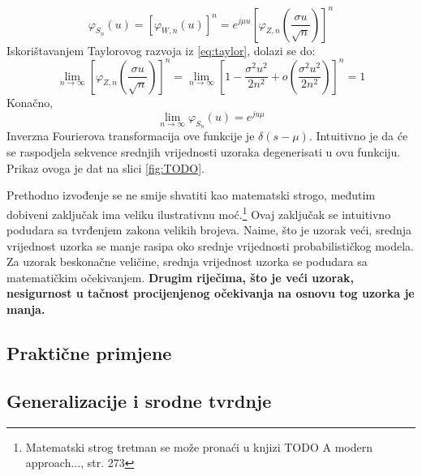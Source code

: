 \begin{equation}
  \varphi_{S_n}(u) = [\varphi_{W,n}(u)]^n
  = e^{j\mu u} \left[\varphi_{Z,n}\left(\frac{\sigma u}{\sqrt{n}}\right)\right]^n
\end{equation}
%
Iskorištavanjem Taylorovog razvoja iz \eqref{eq:taylor}, dolazi se do:
\begin{equation}
  \lim_{n\to\infty}
    \left[\varphi_{Z,n}\left(\frac{\sigma u}{\sqrt{n}}\right)\right]^n
    = \lim_{n\to\infty} \left[1-\frac{\sigma^2u^2}{2n^2} +
      o\left(\frac{\sigma^2u^2}{2n^2}\right)\right]^n
    = 1
\end{equation}
Konačno,
\begin{equation}
  \lim_{n\to\infty} \varphi_{S_n}(u) = e^{ju\mu}
\end{equation}
Inverzna Fourierova transformacija ove funkcije je $\delta(s-\mu)$. Intuitivno
je da će se raspodjela sekvence srednjih vrijednosti uzoraka degenerisati u ovu
funkciju. Prikaz ovoga je dat na slici \ref{fig:TODO}.

Prethodno izvođenje se ne smije shvatiti kao matematski strogo, međutim dobiveni
zaključak ima veliku ilustrativnu moć.\footnote{Matematski strog tretman se može
pronaći u knjizi TODO A modern approach..., str. 273} Ovaj zaključak se intuitivno
podudara sa tvrđenjem zakona velikih brojeva.  Naime, što je uzorak veći,
srednja vrijednost uzorka se manje rasipa oko srednje vrijednosti
probabilističkog modela. Za uzorak beskonačne veličine, srednja vrijednost
uzorka se podudara sa matematičkim očekivanjem.  \textbf{Drugim riječima, što je
veći uzorak, nesigurnost u tačnost procijenjenog očekivanja na osnovu tog uzorka
je manja.} %

\subsection{Praktične primjene}

\subsection{Generalizacije i srodne tvrdnje}

